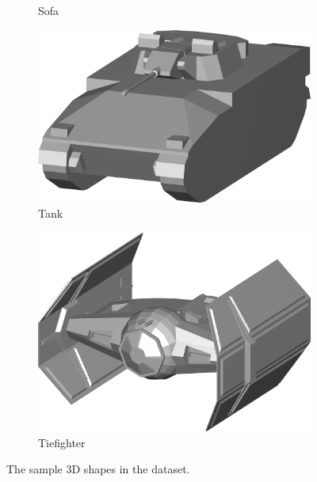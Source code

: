 \begin{figure}
\begin{subfigure}[t]{0.19\linewidth}
		\caption{Sofa} 	
	\end{subfigure}
	\begin{subfigure}[t]{0.19\linewidth} \centering
		\includegraphics[width=1\linewidth]{./fig/eval/24tank.png}  
		\caption{Tank} 	
	\end{subfigure} 
	\begin{subfigure}[t]{0.19\linewidth} \centering
		\includegraphics[width=1\linewidth]{./fig/eval/25tiefighter.png}  
		\caption{Tiefighter} 	
	\end{subfigure} 
	\caption{The sample 3D shapes in the \meshset dataset.}
	\label{fig/eval/sampleshapes}
\end{figure}
